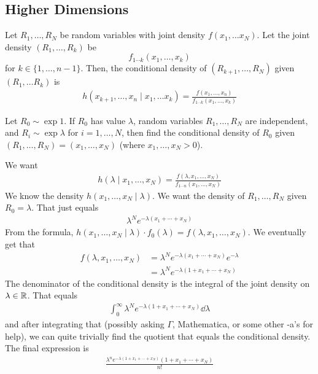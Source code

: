 \subsection{Higher Dimensions}
Let $R_1, \ldots, R_N$ be random variables with joint density $f(x_1, \ldots x_N)$. Let the joint density $(R_1, \ldots, R_k)$ be $$f_{1\cdots k}(x_1, \ldots, x_k)$$ for $k \in \{ 1, \ldots, n - 1 \}$. Then, the conditional density of $(R_{k+1}, \ldots, R_N)$ given $(R_1, \ldots R_k)$ is
\begin{align}
    h(x_{k+1}, \ldots, x_n \mid x_1, \ldots x_k) = \frac{f(x_1, \ldots, x_n)}{f_{1\cdots k}(x_1, \ldots, x_k)}
\end{align}
\begin{example}
    Let $R_0 \sim \exp{1}$. If $R_0$ has value $\lambda$, random variables $R_1, \ldots, R_N$ are independent, and $R_i \sim \exp{\lambda}$ for $i = 1, \ldots, N$, then find the conditional density of $R_0$ given $(R_1, \ldots, R_N) = (x_1, \ldots, x_N)$ (where $x_1, \ldots, x_N > 0$).
\end{example}
\begin{solution}
    We want
    \begin{align}
        h(\lambda \mid x_1, \ldots, x_N) = \frac{f(\lambda, x_1, \ldots, x_N)}{f_{1\cdots n}(x_1, \ldots, x_N)}
    \end{align}
    We know the density $h(x_1, \ldots, x_N \mid \lambda)$. We want the density of $R_1, \ldots, R_N$ given $R_0 = \lambda$. That just equals
    \begin{align}
        \lambda^N e^{-\lambda(x_1 + \cdots + x_N)}
    \end{align}
    From the formula, $h(x_1, \ldots, x_N \mid \lambda) \cdot f_0(\lambda) = f(\lambda, x_1, \ldots, x_N)$. We eventually get that
    \begin{align}
        f(\lambda, x_1, \ldots, x_N) &= \lambda^N e^{-\lambda(x_1 + \cdots + x_N)}e^{-\lambda}\\
        &= \lambda^N e^{-\lambda(1 + x_1 + \cdots + x_N)}
    \end{align}
    The denominator of the conditional density is the integral of the joint density on $\lambda \in \mathbb{R}$. That equals
    \begin{align}
        \int_0^\infty \lambda^N e^{-\lambda(1 + x_1 + \cdots + x_N)} \dd{\lambda}
    \end{align}
    and after integrating that (possibly asking $\Gamma$, Mathematica, or some other -a's for help), we can quite trivially find the quotient that equals the conditional density. The final expression is
    \begin{align}
        \frac{\lambda^n e^{-\lambda(1 + x_1 + \cdots + x_N)}(1 + x_1 + \cdots + x_N)}{n!}
    \end{align}
\end{solution}

